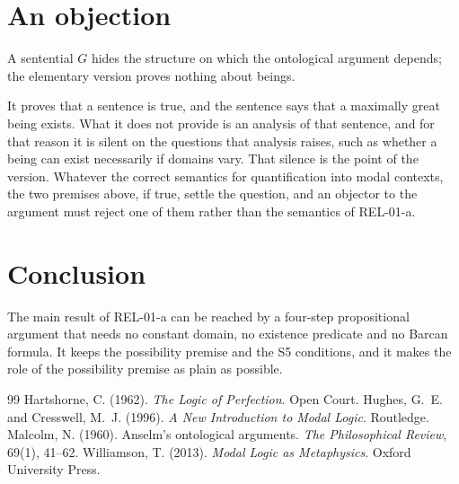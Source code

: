 \documentclass{situationist-preprint}
\begin{document}
\section{An objection}

\begin{objection}
A sentential $G$ hides the structure on which the ontological argument depends; the elementary version proves nothing about beings.
\end{objection}

\begin{reply}
It proves that a sentence is true, and the sentence says that a maximally great being exists. What it does not provide is an analysis of that sentence, and for that reason it is silent on the questions that analysis raises, such as whether a being can exist necessarily if domains vary. That silence is the point of the version. Whatever the correct semantics for quantification into modal contexts, the two premises above, if true, settle the question, and an objector to the argument must reject one of them rather than the semantics of REL-01-a.
\end{reply}

\section{Conclusion}

The main result of REL-01-a can be reached by a four-step propositional argument that needs no constant domain, no existence predicate and no Barcan formula. It keeps the possibility premise and the S5 conditions, and it makes the role of the possibility premise as plain as possible.

\begin{thebibliography}{99}\small
{} Hartshorne, C. (1962). \emph{The Logic of Perfection}. Open Court.
 Hughes, G.~E. and Cresswell, M.~J. (1996). \emph{A New Introduction to Modal Logic}. Routledge.
 Malcolm, N. (1960). Anselm's ontological arguments. \emph{The Philosophical Review}, 69(1), 41--62.
 Williamson, T. (2013). \emph{Modal Logic as Metaphysics}. Oxford University Press.
\end{thebibliography}
\end{document}
